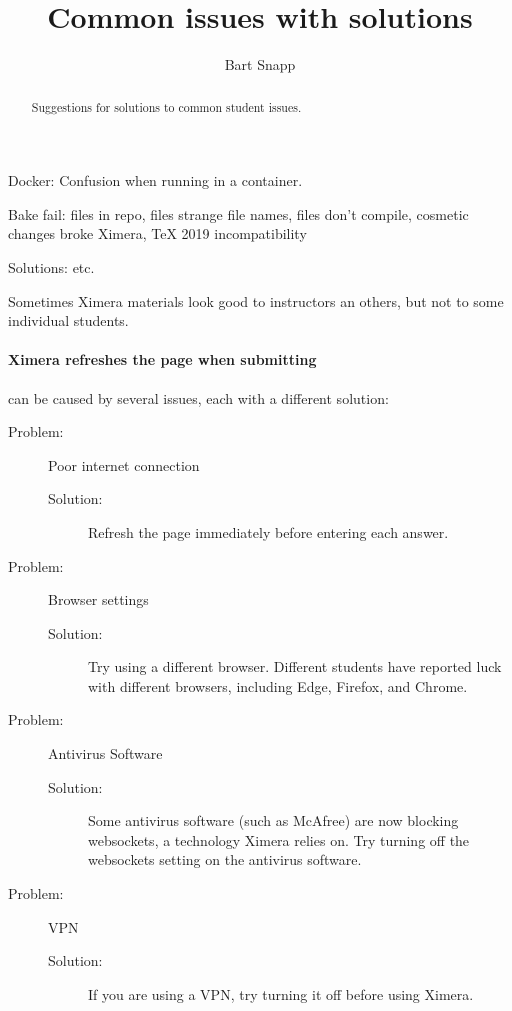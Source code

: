 \documentclass{ximera}
\title{Common issues with solutions}
\author{Bart Snapp}
\begin{document}
\begin{abstract}
    Suggestions for solutions to common student issues.
\end{abstract}
\maketitle


Docker: Confusion when running in a container.

Bake fail: files in repo, files strange file names, files don't compile, cosmetic changes broke Ximera, TeX 2019 incompatibility

Solutions: etc.





Sometimes Ximera materials look good to instructors an others, but not to some
individual students.


\paragraph{Ximera refreshes the page when submitting}
can be caused by several issues, each with a different solution:
\begin{description}
\item[Problem:] Poor internet connection
\begin{description}
    \item[Solution:] Refresh the page immediately before entering each answer.
\end{description}
\item[Problem:] Browser settings
\begin{description}
    \item[Solution:] Try using a different browser. Different students have
reported luck with different browsers, including Edge, Firefox, and Chrome.
\end{description}
\item[Problem:] Antivirus Software
\begin{description}
    \item[Solution:] Some antivirus software (such as McAfree) are now blocking
websockets, a technology Ximera relies on. Try turning off the websockets setting on the antivirus software.

\end{description}
\item[Problem:] VPN
\begin{description}
    \item[Solution:] If you are using a VPN, try turning it off before using
Ximera.
\end{description}
\end{description}
\end{document}
